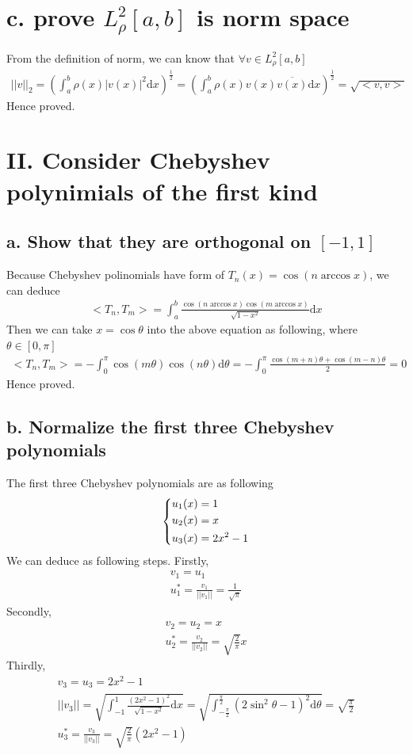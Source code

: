 \documentclass[twoside,a4paper]{article}
\newcommand{\dif}{\mathrm{d}}
\begin{document}
\section*{c. prove $L_\rho^2[a,b]$ is norm space}
From the definition of norm, we can know that $\forall v \in L_\rho^2[a,b]$
\begin{gather}
||v||_2=(\int_a^b \rho(x)|v(x)|^2 \dif x)^{\frac{1}{2}} =(\int_a^b \rho(x)v(x)\overline{v(x)} \dif x)^{\frac{1}{2}}=\sqrt{<v,v>}
\end{gather}
Hence proved.
\section*{II. Consider Chebyshev polynimials of the first kind}
\subsection*{a. Show that they are orthogonal on $[-1,1]$}
Because Chebyshev polinomials have form of $T_n(x)=\cos{(n\arccos{x})}$, we can deduce 
\begin{gather}
<T_n,T_m>=\int_a^b \frac{\cos{(n\arccos{x})}\cos{(m\arccos{x})}}{\sqrt{1-x^2}} \dif x
\end{gather}
Then we can take $x=\cos{\theta}$ into the above equation as following, where $\theta \in [0,\pi]$
\begin{gather}
<T_n,T_m>=-\int_0^\pi {\cos(m \theta) \cos{(n \theta)}}\dif \theta=-\int_0^\pi \frac{\cos{(m+n)\theta}+\cos{(m-n)\theta}}{2}=0
\end{gather}
Hence proved.
\subsection*{b. Normalize the first three Chebyshev polynomials}
The first three Chebyshev polynomials are as following 
\[ \left \{ \begin{lgathered}
u_1(x)=1 \\
u_2(x)=x \\
u_3(x)=2x^2-1
\end{lgathered} \right. \]
We can deduce as following steps. Firstly, 
\begin{gather}
v_1=u_1\\
u_1^*=\frac{v_1}{||v_1||}=\frac{1}{\sqrt{\pi}}
\end{gather}
Secondly,
\begin{gather}
v_2=u_2=x\\
u_2^*=\frac{v_2}{||v_2||}=\sqrt{\frac{2}{\pi}}x
\end{gather}
Thirdly,
\begin{gather}
v_3=u_3=2x^2-1\\
||v_3||=\sqrt{\int_{-1}^{1}\frac{(2x^2-1)^2}{\sqrt{1-x^2}} \dif x}=\sqrt{\int_{-\frac{\pi}{2}}^{\frac{\pi}{2}}(2\sin^2{\theta}-1)^2\dif \theta}=\sqrt{\frac{\pi}{2}}\\
u_3^*=\frac{v_3}{||v_3||}=\sqrt{\frac{2}{\pi}}(2x^2-1)
\end{gather}
\end{document}

